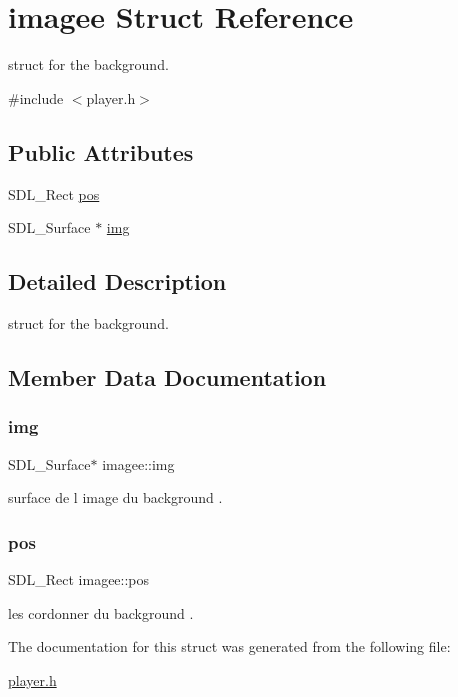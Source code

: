 \hypertarget{structimagee}{}\section{imagee Struct Reference}
\label{structimagee}


struct for the background.  




{\ttfamily \#include $<$player.\+h$>$}

\subsection*{Public Attributes}
\begin{DoxyCompactItemize}
\item 
S\+D\+L\+\_\+\+Rect \hyperlink{structimagee_a8b5324837000bbbb494d2b060430f3bd}{pos}
\item 
S\+D\+L\+\_\+\+Surface $\ast$ \hyperlink{structimagee_a70a0ab948660e415cb96a513a0d1a449}{img}
\end{DoxyCompactItemize}


\subsection{Detailed Description}
struct for the background. 

\subsection{Member Data Documentation}
\mbox{\label{structimagee_a70a0ab948660e415cb96a513a0d1a449}} 
\subsubsection{\texorpdfstring{img}{img}}
{\footnotesize\ttfamily S\+D\+L\+\_\+\+Surface$\ast$ imagee\+::img}

surface de l image du background . \mbox{\label{structimagee_a8b5324837000bbbb494d2b060430f3bd}} 
\subsubsection{\texorpdfstring{pos}{pos}}
{\footnotesize\ttfamily S\+D\+L\+\_\+\+Rect imagee\+::pos}

les cordonner du background . 

The documentation for this struct was generated from the following file\+:\begin{DoxyCompactItemize}
\item 
\hyperlink{player_8h}{player.\+h}\end{DoxyCompactItemize}
